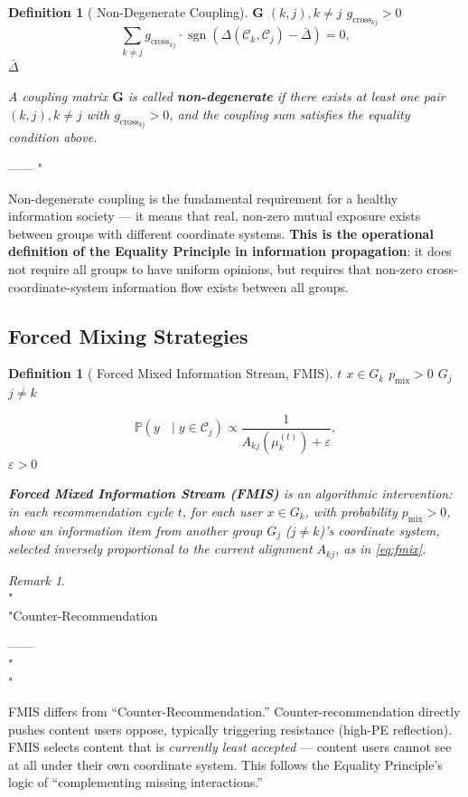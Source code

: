 \documentclass[11pt,a4paper]{article}
\newtheorem{definition}[theorem]{Definition}
\theoremstyle{remark}
\newtheorem{remark}[theorem]{Remark}
\DeclareMathOperator{\sgn}{sgn}
\newcommand{\Pbb}{\mathbb{P}}
\newcommand{\GCoupling}{g_{\text{cross}}}
\newcommand{\CoordSys}{\mathcal{C}}
\begin{document}
\begin{definition}[ Non-Degenerate Coupling]
 $\mathbf{G}$ \textbf{} $(k,j), k \neq j$ 
$\GCoupling_{kj} > 0$
\[
\sum_{k \neq j} \GCoupling_{kj} \cdot \sgn(\Delta(\CoordSys_k, \CoordSys_j) - \bar{\Delta}) = 0,
\]
 $\bar{\Delta}$ 

A coupling matrix $\mathbf{G}$ is called \textbf{non-degenerate} if there exists at least
one pair $(k,j), k \neq j$ with $\GCoupling_{kj} > 0$, and the coupling sum satisfies
the equality condition above.
\end{definition}

——
"\textbf{}

Non-degenerate coupling is the fundamental requirement for a healthy information society --- it means that real, non-zero mutual exposure exists between groups with different coordinate systems. \textbf{This is the operational definition of the Equality Principle in information propagation}: it does not require all groups to have uniform opinions, but requires that non-zero cross-coordinate-system information flow exists between all groups.

\subsection{}

\subsection{Forced Mixing Strategies}

\begin{definition}[ Forced Mixed Information Stream, FMIS]
\textbf{} $t$
 $x \in G_k$ $p_{\text{mix}} > 0$ 
 $G_j$$j \neq k$

\begin{equation}\label{eq:fmix}
\Pbb(y \text{ } \mid y \in \CoordSys_j) \propto
\frac{1}{A_{kj}(\mu_k^{(t)}) + \varepsilon},
\end{equation}
 $\varepsilon > 0$ 

\textbf{Forced Mixed Information Stream (FMIS)} is an algorithmic intervention: in each
recommendation cycle $t$, for each user $x \in G_k$, with probability $p_{\text{mix}} > 0$,
show an information item from another group $G_j$ ($j \neq k$)'s coordinate system,
selected inversely proportional to the current alignment $A_{kj}$, as in \eqref{eq:fmix}.
\end{definition}

\begin{remark}
\\"\\"Counter-Recommendation

——
\\"\\"

FMIS differs from ``Counter-Recommendation.'' Counter-recommendation directly pushes
content users oppose, typically triggering resistance (high-PE reflection). FMIS selects
content that is \textit{currently least accepted} --- content users cannot see at all
under their own coordinate system. This follows the Equality Principle's logic of
``complementing missing interactions.''
\end{remark}
\end{document}
